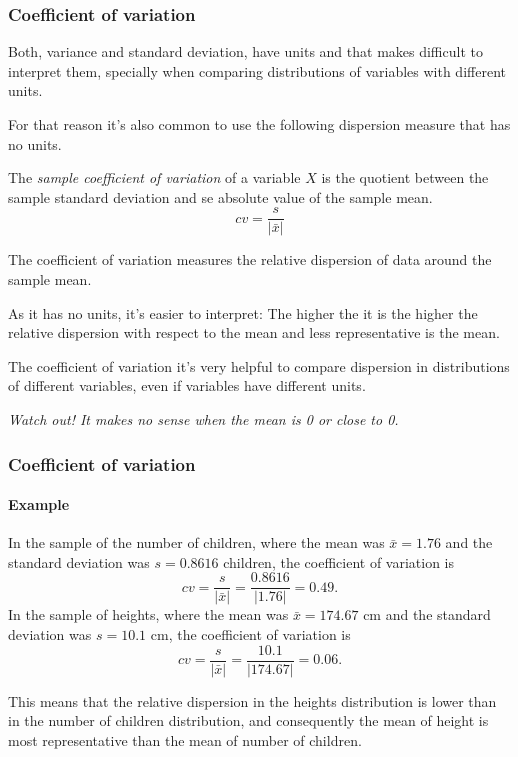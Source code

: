\begin{frame}
\frametitle{Coefficient of variation}
Both, variance and standard deviation, have units and that makes difficult to interpret them, specially when comparing
distributions of variables with different units.

For that reason it's also common to use the following dispersion measure that has no units.  
\begin{definition}
The \emph{sample coefficient of variation} of a variable $X$ is the quotient between the sample standard deviation and se
absolute value of the sample mean.
\[
cv = \frac{s}{|\bar x|}
\]
\end{definition}
The coefficient of variation measures the relative dispersion of data around the sample mean.  

As it has no units, it's easier to interpret: The higher the it is the higher the relative dispersion with respect to
the mean and less representative is the mean.

The coefficient of variation it's very helpful to compare dispersion in distributions of different variables, even if
variables have different units.
\begin{center}
\alert{\emph{Watch out! It makes no sense when the mean is 0 or close to 0.}}
\end{center}
\end{frame}


\begin{frame}
\frametitle{Coefficient of variation}
\framesubtitle{Example}
In the sample of the number of children, where the mean was $\bar x=1.76$ and the standard deviation was $s=0.8616$
children, the coefficient of variation is
\[
cv = \frac{s}{|\bar x|} = \frac{0.8616}{|1.76|} = 0.49.
\]
In the sample of heights, where the mean was $\bar x=174.67$ cm and the standard deviation was $s=10.1$ cm, the
coefficient of variation is
\[
cv = \frac{s}{|\bar x|} = \frac{10.1}{|174.67|} = 0.06.
\]

This means that the relative dispersion in the heights distribution is lower than in the number of children
distribution, and consequently the mean of height is most representative than the mean of number of children.
\end{frame}


